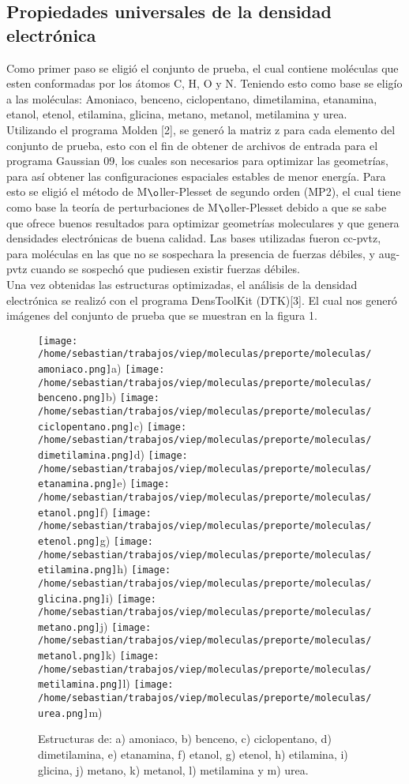 \documentclass[12pt,letterpaper]{article}
\begin{document}
\subsection{Propiedades universales de la densidad electrónica} 
Como primer paso se eligió el conjunto de prueba, el cual contiene moléculas que esten conformadas por los átomos C, H, O y N. Teniendo esto como base se eligío  a las moléculas: Amoniaco, benceno, ciclopentano, dimetilamina, etanamina, etanol, etenol, etilamina, glicina, metano, metanol, metilamina y urea.\\
Utilizando el programa Molden [2], se generó la matriz z para cada elemento del conjunto de prueba, esto con el fin de obtener de archivos de entrada para el programa Gaussian 09, los cuales son necesarios para optimizar las geometrías, para así obtener las configuraciones espaciales estables de menor energía. Para esto se eligió el método de M$\o$ller-Plesset de segundo orden (MP2), el cual tiene como base la teoría de perturbaciones de M$\o$ller-Plesset debido a que se sabe que ofrece buenos resultados para optimizar geometrías moleculares y que genera densidades electrónicas de buena calidad. Las bases utilizadas fueron cc-pvtz, para moléculas en las que no se sospechara la presencia de fuerzas débiles, y aug-pvtz cuando se sospechó que pudiesen existir fuerzas débiles.
\\
Una vez obtenidas las estructuras optimizadas, el análisis de la densidad electrónica se realizó con el programa DensToolKit (DTK)[3]. El cual nos generó imágenes del conjunto de prueba que se muestran en la figura 1.\\
\begin{figure}[H]
\centering
\texttt{[image: /home/sebastian/trabajos/viep/moleculas/preporte/moleculas/amoniaco.png]}a)
\texttt{[image: /home/sebastian/trabajos/viep/moleculas/preporte/moleculas/benceno.png]}b)
\texttt{[image: /home/sebastian/trabajos/viep/moleculas/preporte/moleculas/ciclopentano.png]}c)
\texttt{[image: /home/sebastian/trabajos/viep/moleculas/preporte/moleculas/dimetilamina.png]}d)
\texttt{[image: /home/sebastian/trabajos/viep/moleculas/preporte/moleculas/etanamina.png]}e)
\texttt{[image: /home/sebastian/trabajos/viep/moleculas/preporte/moleculas/etanol.png]}f)
\texttt{[image: /home/sebastian/trabajos/viep/moleculas/preporte/moleculas/etenol.png]}g)
\texttt{[image: /home/sebastian/trabajos/viep/moleculas/preporte/moleculas/etilamina.png]}h)
\texttt{[image: /home/sebastian/trabajos/viep/moleculas/preporte/moleculas/glicina.png]}i)
\texttt{[image: /home/sebastian/trabajos/viep/moleculas/preporte/moleculas/metano.png]}j)
\texttt{[image: /home/sebastian/trabajos/viep/moleculas/preporte/moleculas/metanol.png]}k)
\texttt{[image: /home/sebastian/trabajos/viep/moleculas/preporte/moleculas/metilamina.png]}l)
\texttt{[image: /home/sebastian/trabajos/viep/moleculas/preporte/moleculas/urea.png]}m)
\caption{Estructuras de: a) amoniaco, b) benceno,  c) ciclopentano, d) dimetilamina, e) etanamina, f) etanol, g) etenol, h) etilamina, i) glicina, j) metano, k) metanol, l) metilamina y m) urea.}
\end{figure} 
\end{document}
